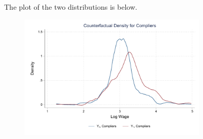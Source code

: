 \documentclass{article}
\begin{document}
\begin{solution}
The plot of the two distributions is below.
\begin{figure}[H]
    \centering
    \includegraphics[width=0.8\textwidth]{ps3/figures/q4_partf_compliers.pdf}
\end{figure}
\end{solution}
\end{document}
